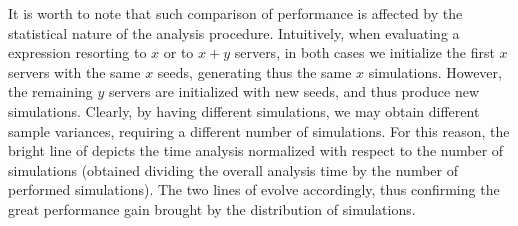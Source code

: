 \documentclass[12pt,a4paper,twoside,openright]{book}
\begin{document}
It is worth to note that such comparison of performance is affected by the statistical nature of the analysis procedure. 
%
Intuitively, when evaluating a \multiquatex{} expression resorting to $x$ or to $x + y$ servers, in both cases we initialize the first $x$ servers with the same $x$ seeds, generating thus the same $x$ simulations. However, the remaining $y$ servers are initialized with new seeds, and thus produce new simulations.
Clearly, by having different simulations, we may obtain different sample variances, requiring a different number of simulations.
%
For this reason, the bright line of  depicts the time analysis normalized with respect to the number of simulations (obtained dividing the overall analysis time by the number of performed simulations).
%
The two lines of  evolve accordingly, thus confirming the great performance gain brought by the distribution of simulations.

\begin{table}[tb]
 \caption{Time performance improvements reusing simulations (seconds).}
\begin{center}
\end{center}
 \label{tab:reuse}
\end{table}
\end{document}
